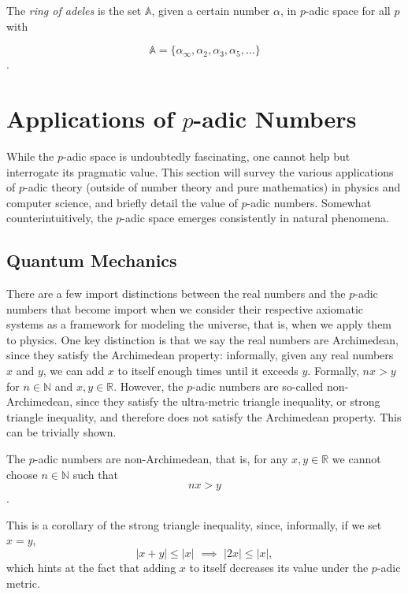 \documentclass[a4paper]{article}
\begin{document}
\begin{definition}{}
The \textit{ring of adeles} is the set $\mathbb{A}$, given a certain number $\alpha$, in $p$-adic space for all $p$ with

\[\mathbb{A}  = \{\alpha_{\infty}, \alpha_2, \alpha_3, \alpha_5,...\}\].

\end{definition}




\section{Applications of $p$-adic Numbers}

While the $p$-adic space is undoubtedly fascinating, one cannot help but interrogate its pragmatic value. This section will survey the various applications of $p$-adic theory (outside of number theory and pure mathematics) in physics and computer science, and briefly detail the value of $p$-adic numbers. Somewhat counterintuitively, the $p$-adic space emerges consistently in natural phenomena.

\subsection{Quantum Mechanics}

There are a few import distinctions between the real numbers and the $p$-adic numbers that become import when we consider their respective axiomatic systems as a framework for modeling the universe, that is, when we apply them to physics. \cite{rozikov} One key distinction is that we say the real numbers are Archimedean, since they satisfy the Archimedean property: informally, given any real numbers $x$ and $y$, we can add $x$ to itself enough times until it exceeds $y$. Formally, $nx > y$ for $n \in \mathbb{N}$ and $x, y \in \mathbb{R}$. However, the $p$-adic numbers are so-called non-Archimedean, since they satisfy the ultra-metric triangle inequality, or strong triangle inequality, and therefore does not satisfy the Archimedean property. This can be trivially shown.

\begin{theorem}

The $p$-adic numbers are non-Archimedean, that is, for any $x, y \in \mathbb{R}$ we cannot choose $n \in \mathbb{N}$ such that
\[nx > y\].

\end{theorem}

This is a corollary of the strong triangle inequality, since, informally, if we set $x=y$, \[|x+y| \leq |x|\,\, \implies \,\,|2x| \leq |x|,\] which hints at the fact that adding $x$ to itself decreases its value under the $p$-adic metric. 
\end{document}
